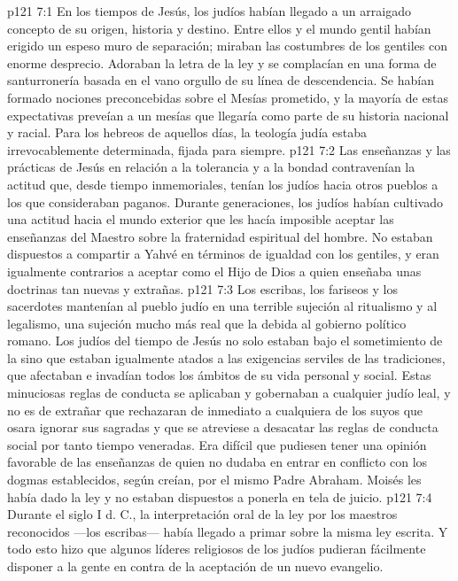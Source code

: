\vs p121 7:1 En los tiempos de Jesús, los judíos habían llegado a un arraigado concepto de su origen, historia y destino. Entre ellos y el mundo gentil habían erigido un espeso muro de separación; miraban las costumbres de los gentiles con enorme desprecio. Adoraban la letra de la ley y se complacían en una forma de santurronería basada en el vano orgullo de su línea de descendencia. Se habían formado nociones preconcebidas sobre el Mesías prometido, y la mayoría de estas expectativas preveían a un mesías que llegaría como parte de su historia nacional y racial. Para los hebreos de aquellos días, la teología judía estaba irrevocablemente determinada, fijada para siempre.
\vs p121 7:2 Las enseñanzas y las prácticas de Jesús en relación a la tolerancia y a la bondad contravenían la actitud que, desde tiempo inmemoriales, tenían los judíos hacia otros pueblos a los que consideraban paganos. Durante generaciones, los judíos habían cultivado una actitud hacia el mundo exterior que les hacía imposible aceptar las enseñanzas del Maestro sobre la fraternidad espiritual del hombre. No estaban dispuestos a compartir a Yahvé en términos de igualdad con los gentiles, y eran igualmente contrarios a aceptar como el Hijo de Dios a quien enseñaba unas doctrinas tan nuevas y extrañas.
\vs p121 7:3 Los escribas, los fariseos y los sacerdotes mantenían al pueblo judío en una terrible sujeción al ritualismo y al legalismo, una sujeción mucho más real que la debida al gobierno político romano. Los judíos del tiempo de Jesús no solo estaban bajo el sometimiento de la  sino que estaban igualmente atados a las exigencias serviles de las tradiciones, que afectaban e invadían todos los ámbitos de su vida personal y social. Estas minuciosas reglas de conducta se aplicaban y gobernaban a cualquier judío leal, y no es de extrañar que rechazaran de inmediato a cualquiera de los suyos que osara ignorar sus sagradas  y que se atreviese a desacatar las reglas de conducta social por tanto tiempo veneradas. Era difícil que pudiesen tener una opinión favorable de las enseñanzas de quien no dudaba en entrar en conflicto con los dogmas establecidos, según creían, por el mismo Padre Abraham. Moisés les había dado la ley y no estaban dispuestos a ponerla en tela de juicio.
\vs p121 7:4 Durante el siglo I d. C., la interpretación oral de la ley por los maestros reconocidos ---los escribas--- había llegado a primar sobre la misma ley escrita. Y todo esto hizo que algunos líderes religiosos de los judíos pudieran fácilmente disponer a la gente en contra de la aceptación de un nuevo evangelio.
